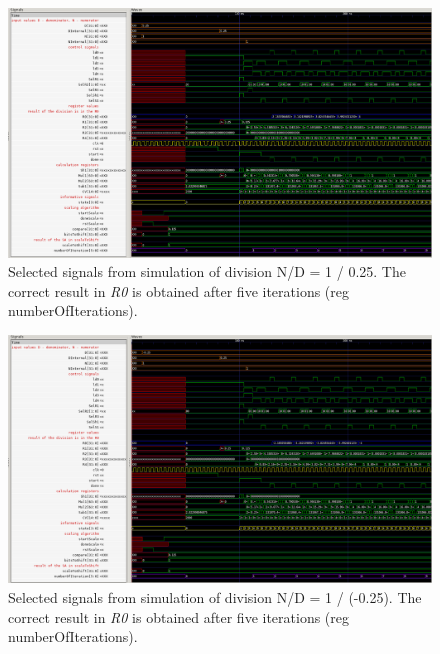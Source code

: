 \documentclass[a4paper, twoside, 11pt]{article}
\begin{document}
\begin{figure}[htbp!]
  \centering
  \includegraphics[width=1\textwidth]{src/png/division-1-div-0-25.png}
   \caption{Selected signals from simulation of division N/D = 1 / 0.25. The correct result in \textit{R0} is obtained after five iterations (reg numberOfIterations).}
  \label{fig:division-1-div-0-25}
\end{figure}

\begin{figure}[htbp!]
  \centering
  \includegraphics[width=1\textwidth]{src/png/division-1-div-minus-0-25.png}
    \caption{Selected signals from simulation of division N/D = 1 / (-0.25). The correct result in \textit{R0} is obtained after five iterations (reg numberOfIterations).}
  \label{fig:division-1-div-minus-0-25}
\end{figure}
\end{document}
